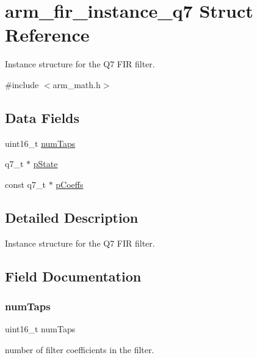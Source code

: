 \hypertarget{structarm__fir__instance__q7}{}\section{arm\+\_\+fir\+\_\+instance\+\_\+q7 Struct Reference}
\label{structarm__fir__instance__q7}


Instance structure for the Q7 F\+IR filter.  




{\ttfamily \#include $<$arm\+\_\+math.\+h$>$}

\subsection*{Data Fields}
\begin{DoxyCompactItemize}
\item 
uint16\+\_\+t \mbox{\hyperlink{structarm__fir__instance__q7_a751941891e47f522a7f5375fe8990aac}{num\+Taps}}
\item 
q7\+\_\+t $\ast$ \mbox{\hyperlink{structarm__fir__instance__q7_aa8f67102521b620af6f259afdcf29785}{p\+State}}
\item 
const q7\+\_\+t $\ast$ \mbox{\hyperlink{structarm__fir__instance__q7_abe82cb517dbe44d3938c3b38265870b2}{p\+Coeffs}}
\end{DoxyCompactItemize}


\subsection{Detailed Description}
Instance structure for the Q7 F\+IR filter. 

\subsection{Field Documentation}
\mbox{\label{structarm__fir__instance__q7_a751941891e47f522a7f5375fe8990aac}} 
\subsubsection{\texorpdfstring{numTaps}{numTaps}}
{\footnotesize\ttfamily uint16\+\_\+t num\+Taps}

number of filter coefficients in the filter. \mbox{\label{structarm__fir__instance__q7_abe82cb517dbe44d3938c3b38265870b2}} 
